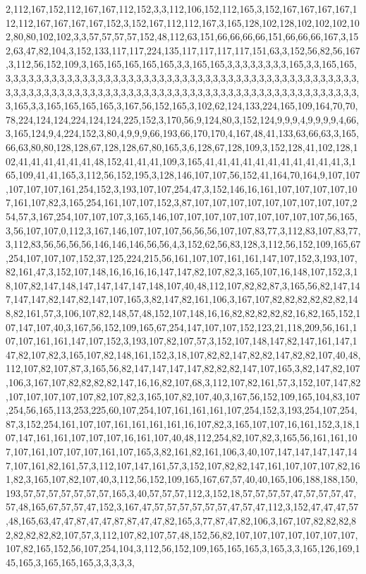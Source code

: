 2,112,167,152,112,167,167,112,152,3,3,112,106,152,112,165,3,152,167,167,167,167,112,112,167,167,167,167,152,3,152,167,112,112,167,3,165,128,102,128,102,102,102,102,80,80,102,102,3,3,57,57,57,57,152,48,112,63,151,66,66,66,66,151,66,66,66,167,3,152,63,47,82,104,3,152,133,117,117,224,135,117,117,117,117,151,63,3,152,56,82,56,167,3,112,56,152,109,3,165,165,165,165,165,3,3,165,165,3,3,3,3,3,3,3,3,165,3,3,165,165,3,3,3,3,3,3,3,3,3,3,3,3,3,3,3,3,3,3,3,3,3,3,3,3,3,3,3,3,3,3,3,3,3,3,3,3,3,3,3,3,3,3,3,3,3,3,3,3,3,3,3,3,3,3,3,3,3,3,3,3,3,3,3,3,3,3,3,3,3,3,3,3,3,3,3,3,3,3,3,3,3,3,3,3,3,3,3,3,3,3,3,3,3,165,3,3,165,165,165,165,3,167,56,152,165,3,102,62,124,133,224,165,109,164,70,70,78,224,124,124,224,124,124,225,152,3,170,56,9,124,80,3,152,124,9,9,9,4,9,9,9,9,4,66,3,165,124,9,4,224,152,3,80,4,9,9,9,66,193,66,170,170,4,167,48,41,133,63,66,63,3,165,66,63,80,80,128,128,67,128,128,67,80,165,3,6,128,67,128,109,3,152,128,41,102,128,102,41,41,41,41,41,41,48,152,41,41,41,109,3,165,41,41,41,41,41,41,41,41,41,41,41,3,165,109,41,41,165,3,112,56,152,195,3,128,146,107,107,56,152,41,164,70,164,9,107,107,107,107,107,161,254,152,3,193,107,107,254,47,3,152,146,16,161,107,107,107,107,107,161,107,82,3,165,254,161,107,107,152,3,87,107,107,107,107,107,107,107,107,107,254,57,3,167,254,107,107,107,3,165,146,107,107,107,107,107,107,107,107,107,56,165,3,56,107,107,0,112,3,167,146,107,107,107,56,56,56,107,107,83,77,3,112,83,107,83,77,3,112,83,56,56,56,56,146,146,146,56,56,4,3,152,62,56,83,128,3,112,56,152,109,165,67,254,107,107,107,152,37,125,224,215,56,161,107,107,161,161,147,107,152,3,193,107,82,161,47,3,152,107,148,16,16,16,16,147,147,82,107,82,3,165,107,16,148,107,152,3,18,107,82,147,148,147,147,147,147,148,107,40,48,112,107,82,82,87,3,165,56,82,147,147,147,147,82,147,82,147,107,165,3,82,147,82,161,106,3,167,107,82,82,82,82,82,82,148,82,161,57,3,106,107,82,148,57,48,152,107,148,16,16,82,82,82,82,82,16,82,165,152,107,147,107,40,3,167,56,152,109,165,67,254,147,107,107,152,123,21,118,209,56,161,107,107,161,161,147,107,152,3,193,107,82,107,57,3,152,107,148,147,82,147,161,147,147,82,107,82,3,165,107,82,148,161,152,3,18,107,82,82,147,82,82,147,82,82,107,40,48,112,107,82,107,87,3,165,56,82,147,147,147,147,82,82,82,147,107,165,3,82,147,82,107,106,3,167,107,82,82,82,82,147,16,16,82,107,68,3,112,107,82,161,57,3,152,107,147,82,107,107,107,107,107,82,107,82,3,165,107,82,107,40,3,167,56,152,109,165,104,83,107,254,56,165,113,253,225,60,107,254,107,161,161,161,107,254,152,3,193,254,107,254,87,3,152,254,161,107,107,161,161,161,161,16,107,82,3,165,107,107,16,161,152,3,18,107,147,161,161,107,107,107,16,161,107,40,48,112,254,82,107,82,3,165,56,161,161,107,107,161,107,107,107,161,107,165,3,82,161,82,161,106,3,40,107,147,147,147,147,147,107,161,82,161,57,3,112,107,147,161,57,3,152,107,82,82,147,161,107,107,107,82,161,82,3,165,107,82,107,40,3,112,56,152,109,165,167,67,57,40,40,165,106,188,188,150,193,57,57,57,57,57,57,57,165,3,40,57,57,57,112,3,152,18,57,57,57,57,47,57,57,57,47,57,48,165,67,57,57,47,152,3,167,47,57,57,57,57,57,57,47,57,47,112,3,152,47,47,47,57,48,165,63,47,47,87,47,47,87,87,47,47,82,165,3,77,87,47,82,106,3,167,107,82,82,82,82,82,82,82,82,107,57,3,112,107,82,107,57,48,152,56,82,107,107,107,107,107,107,107,107,82,165,152,56,107,254,104,3,112,56,152,109,165,165,165,3,165,3,3,165,126,169,145,165,3,165,165,165,3,3,3,3,3,